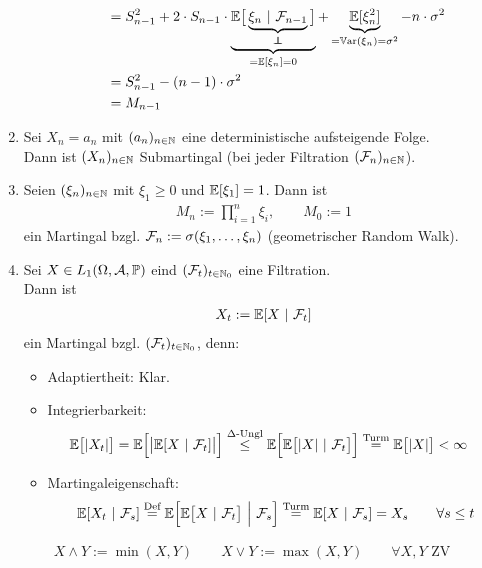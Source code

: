 \begin{beisp}
\begin{enumerate}[label=(\alph*)]
\begin{itemize}
\begin{align*}
&=S_{n-1}^2+2\cdot S_{n-1}\cdot \underbrace{\E\big[\underbrace{\xi_n~|~\F_{n-1}}_{\unab}\big]}_{=\E[\xi_n]=0}+\underbrace{\E[\xi_n^2]}_{=\Var(\xi_n)=\sigma^2}-n\cdot\sigma^2\\
&=S_{n-1}^2-(n-1)\cdot\sigma^2\\
&=M_{n-1}
\end{align*}
\end{itemize}
\item Sei $X_n=a_n$ mit $(a_n)_{n\in\mathbb{N}}$ eine deterministische aufsteigende Folge.\\
Dann ist $(X_n)_{n\in\mathbb{N}}$ Submartingal (bei jeder Filtration $(\mathcal{F}_n)_{n\in\mathbb{N}}$).
\item Seien $(\xi_n)_{n\in\mathbb{N}}$ mit $\xi_1\geq0$ und $\mathbb{E}[\xi_1]=1$. Dann ist
\begin{align*}
M_n:=\prod\limits_{i=1}^n\xi_i,\qquad M_0:=1
\end{align*}
ein Martingal bzgl. $\mathcal{F}_n:=\sigma(\xi_1,\ldots,\xi_n)$ (geometrischer Random Walk).
\item Sei $X\in L_1(\Omega,\mathcal{A},\mathbb{P})$ eind $(\mathcal{F}_t)_{t\in\mathbb{N}_0}$ eine Filtration.\\
Dann ist
\begin{align*}
X_t:=\mathbb{E}[X~|~\mathcal{F}_t]
\end{align*}
ein Martingal bzgl. $(\mathcal{F}_t)_{t\in\mathbb{N}_0}$, denn:
\begin{itemize}
\item Adaptiertheit: Klar.
\item Integrierbarkeit:
\begin{align*}
\mathbb{E}\big[|X_t|\big]
=\mathbb{E}\Big[\big|\mathbb{E}[X~|~\mathcal{F}_t]\big|\Big]
&\stackrel{\Delta\text{-Ungl}}{\leq}
\mathbb{E}\Big[\mathbb{E}\big[|X|~|~\mathcal{F}_t \big]\Big]
\stackrel{\text{Turm}}{=}
\mathbb{E}\big[|X|\big]
<\infty
\end{align*}
\item Martingaleigenschaft:
\begin{align*}
\mathbb{E}[X_t~|~\mathcal{F}_s]
\stackrel{\text{Def}}{=}\mathbb{E}\Big[\mathbb{E}\big[X~|~\mathcal{F}_t\big]~\Big|~ \mathcal{F}_s\Big]
\stackrel{\text{Turm}}{=}
\mathbb{E}[X~|~\mathcal{F}_s]
=X_s
\qquad\forall s\leq t
\end{align*}
\end{itemize}
\end{enumerate}
\end{beisp}

\begin{notation}
\begin{align*}
X\wedge Y:=\min(X,Y)\qquad X\vee Y:=\max(X,Y)\qquad\forall X,Y\text{ ZV}
\end{align*}
\end{notation}

